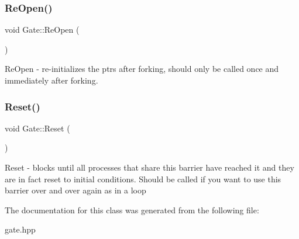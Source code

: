 \subsubsection{\texorpdfstring{Re\+Open()}{ReOpen()}}
{\footnotesize\ttfamily void Gate\+::\+Re\+Open (\begin{DoxyParamCaption}{ }\end{DoxyParamCaption})}

Re\+Open -\/ re-\/initializes the ptrs after forking, should only be called once and immediately after forking. \hypertarget{class_gate_ad1735aaacf5032b1cc89bf42f7aea9f5}{}\label{class_gate_ad1735aaacf5032b1cc89bf42f7aea9f5} 
\subsubsection{\texorpdfstring{Reset()}{Reset()}}
{\footnotesize\ttfamily void Gate\+::\+Reset (\begin{DoxyParamCaption}{ }\end{DoxyParamCaption})}

Reset -\/ blocks until all processes that share this barrier have reached it and they are in fact reset to initial conditions. Should be called if you want to use this barrier over and over again as in a loop 

The documentation for this class was generated from the following file\+:\begin{DoxyCompactItemize}
\item 
gate.\+hpp\end{DoxyCompactItemize}
